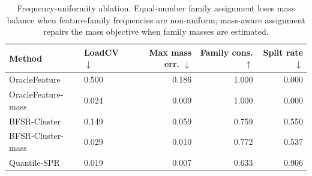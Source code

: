 \begin{table}[!htbp]
\centering
\caption{Frequency-uniformity ablation. Equal-number family assignment loses mass balance when feature-family frequencies are non-uniform; mass-aware assignment repairs the mass objective when family masses are estimated.}
\label{tab:e5_frequency_ablation}
\begin{tabular}{llrrr}
\toprule
Method & LoadCV $\downarrow$ & Max mass err. $\downarrow$ & Family cons. $\uparrow$ & Split rate $\downarrow$ \\
\midrule
OracleFeature & 0.500 & 0.186 & 1.000 & 0.000 \\
OracleFeature-mass & 0.024 & 0.009 & 1.000 & 0.000 \\
BFSR-Cluster & 0.149 & 0.059 & 0.759 & 0.550 \\
BFSR-Cluster-mass & 0.029 & 0.010 & 0.772 & 0.537 \\
Quantile-SPR & 0.019 & 0.007 & 0.633 & 0.906 \\
\bottomrule
\end{tabular}
\end{table}
